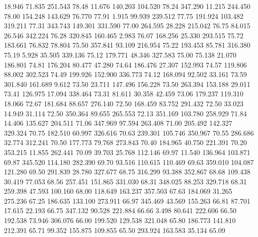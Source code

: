   18.946   71.835  251.543        78.48
  11.676  140.203  104.520        78.24
 347.290   11.215  244.450        78.00
 154.248  143.629   76.770        77.91
   1.915   99.939  239.512        77.75
 191.924  103.482  319.211        77.31
 343.743  149.301  331.590        77.00
 264.595   28.228  215.042        76.75
  84.015   26.546  342.224        76.28
 320.845  160.465    2.983        76.07
 168.256   25.330  293.515        75.72
 183.661   76.832   78.804        75.50
 357.841   93.109  216.954        75.22
 193.453   85.781  316.380        75.19
   5.928   35.505  339.136        75.12
 179.771   48.346  327.583        75.00
  75.138   21.070  186.801        74.81
 176.204   80.477   47.280        74.64
 186.476   27.307  152.993        74.57
 119.806   88.002  302.523        74.49
 199.926  152.900  336.773        74.12
 168.094   92.502   33.161        73.59
 301.840  161.689    9.612        73.50
  23.711  147.496  156.228        73.50
 263.394  153.188   29.011        73.41
 126.975   17.094  338.464        73.31
  81.611   30.358   42.459        73.06
 179.237  119.310   18.066        72.67
 181.684   88.657  276.140        72.50
 168.459   83.752  291.432        72.50
  33.023   14.949   31.114        72.50
 350.364   89.655  265.553        72.13
 351.169  103.780  258.929        71.84
  14.406  135.627  204.511        71.06
 347.969   97.594  263.408        71.00
 205.492  142.327  329.324        70.75
 182.510   60.997  326.616        70.63
 239.301  105.746  350.967        70.55
 286.686   32.774  312.241        70.50
 177.773   79.768  273.843        70.40
 184.965   40.750  221.391        70.20
 353.215   11.855  262.441        70.09
  39.703   25.768  112.146        69.97
  11.540  136.964  103.871        69.87
 345.520  114.180  282.390        69.70
  93.516  110.615  110.469        69.63
 359.010  104.087  121.280        69.50
 291.839   28.780  327.677        68.75
 316.299   93.388  352.867        68.68
 109.438   30.419   77.053        68.56
 257.451  151.865  331.030        68.31
 348.025   88.253  329.718        68.31
 259.398   47.593  100.160        68.00
 118.649  163.237  357.503        67.63
 184.069   31.265  275.236        67.25
 186.635  133.100  273.911        66.97
 345.469   43.569  155.263        66.81
  87.701   17.615   22.193        66.75
 347.132   90.528  221.884        66.66
   3.498   80.641  222.606        66.50
 192.538   73.946  306.076        66.00
 199.520  129.538  321.048        65.80
 186.773  141.810  212.391        65.71
  99.352  155.875  109.855        65.50
 293.924  163.583   35.134        65.09
